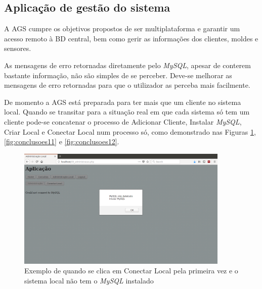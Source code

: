 \documentclass[11pt,twoside,a4paper]{report}
\begin{document}
\subsection{Aplicação de gestão do sistema}
A AGS cumpre os objetivos propostos de ser multiplataforma e garantir um acesso remoto à BD central, bem como gerir as informações dos clientes, moldes e sensores.\par
As mensagens de erro retornadas diretamente pelo \textit{MySQL}, apesar de conterem bastante informação, não são simples de se perceber. Deve-se melhorar as mensagens de erro retornadas para que o utilizador as perceba mais facilmente.\par 
De momento a AGS está preparada para ter mais que um cliente no sistema local. Quando se transitar para a situação real em que cada sistema só tem um cliente pode-se concatenar o processo de Adicionar Cliente, Instalar \textit{MySQL}, Criar Local e Conectar Local num processo só, como demonstrado nas Figuras \ref{fig:conclusoes1}, \ref{fig:conclusoes11} e \ref{fig:conclusoes12}.
\begin{figure}[H]
	\begin{center}
		\includegraphics[width=0.9\textwidth]{futuro03} %
		\caption[Exemplo de quando se clica em Conectar Local pela primeira vez]{Exemplo de quando se clica em Conectar Local pela primeira vez e o sistema local não tem o \textit{MySQL} instalado}
		\label{fig:conclusoes1}
	\end{center}
\end{figure}
\end{document}
